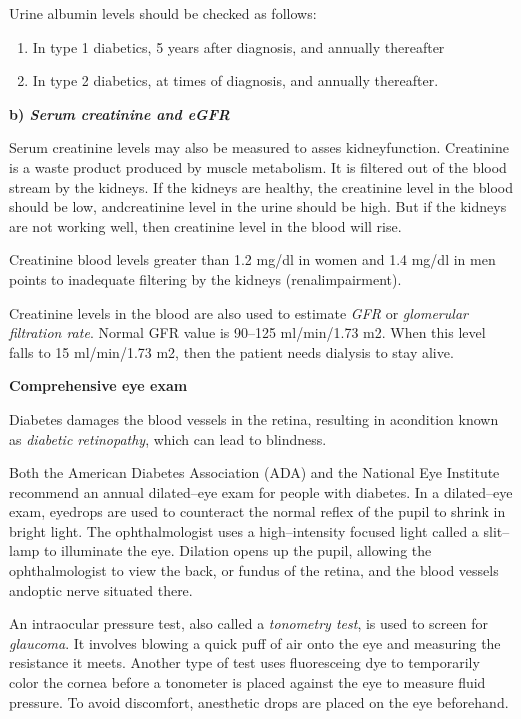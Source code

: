 \noindent Urine albumin levels should be checked as follows:
\begin{enumerate}[•]
\itemsep=0pt
\item In type 1 diabetics, 5 years after diagnosis, and annually thereafter
\item In type 2 diabetics, at times of diagnosis, and annually thereafter.
\end{enumerate}

\clearpage

\textbf{b) \textit{Serum creatinine and eGFR}}

Serum creatinine levels may also be measured to asses kidney\break function. Creatinine is a waste product produced by muscle meta\-bo\-lism. It is filtered out of the blood stream by the kidneys. If the kidneys are healthy, the creatinine level in the blood should be low, and\break creatinine level in the urine should be high. But if the kidneys are not working well, then creatinine level in the blood will rise.

Creatinine blood levels greater than 1.2 mg/dl in women and 1.4 mg/dl in men points to inadequate filtering by the kidneys (renal\break impairment).

Creatinine levels in the blood are also used to estimate \textit{GFR} or \textit{glome\-rular filtration rate}. Normal GFR value is 90–125 ml/min/1.73 m2. When this level falls to 15 ml/min/1.73 m2, then the patient needs dialysis to stay alive.

\noindent\textbf{Comprehensive eye exam}

Diabetes damages the blood vessels in the retina, resulting in a\break condition known as \textit{diabetic retinopathy}, which can lead to blindness.

Both the American Diabetes Association (ADA) and the National Eye Institute recommend an annual dilated–eye exam for people with diabetes. In a dilated–eye exam, eyedrops are used to counteract the normal reflex of the pupil to shrink in bright light. The ophthalmo\-logist uses a high–intensity focused light called a slit–lamp to illuminate the eye. Dilation opens up the pupil, allowing the ophthalmo\-logist to view the back, or fundus of the retina, and the blood vessels and\break optic nerve situated there.

An intraocular pressure test, also called a \textit{tonometry test}, is used to screen for \textit{glaucoma}. It involves blowing a quick puff of air onto the eye and measuring the resistance it meets. Another type of test uses fluoresceing dye to temporarily color the cornea before a tonometer is placed against the eye to measure fluid pressure. To avoid discomfort, anesthetic drops are placed on the eye beforehand.


